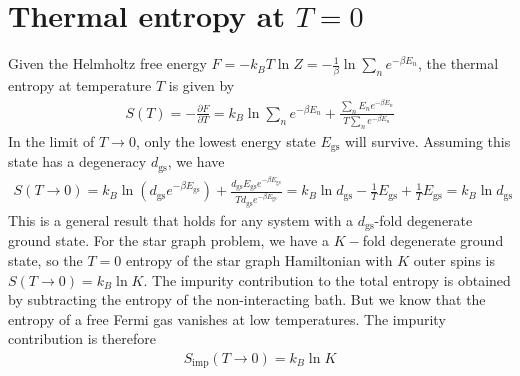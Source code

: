 \documentclass[12pt]{revtex4-2}
\begin{document}
\section{Thermal entropy at \(T=0\)}
Given the Helmholtz free energy \(F = -k_B T \ln Z = - \frac{1}{\beta} \ln\sum_n e^{-\beta E_n}\), the thermal entropy at temperature \(T\) is given by
\begin{align}
	S(T) = - \frac{\partial{F}}{\partial{T}} = k_B \ln\sum_n e^{-\beta E_n} + \frac{\sum_n E_n e^{-\beta E_n}}{T \sum_n e^{-\beta E_n}}
\end{align}
In the limit of \(T \to 0\), only the lowest energy state \(E_\text{gs}\) will survive. Assuming this state has a degeneracy \(d_\text{gs}\), we have
\begin{align}
	S(T \to 0) = k_B \ln\left(d_\text{gs} e^{-\beta E_\text{gs}}\right) + \frac{d_\text{gs} E_\text{gs}e^{-\beta E_\text{gs}}}{T d_\text{gs} e^{-\beta E_\text{gs}}} = k_B \ln d_\text{gs} - \frac{1}{T}E_\text{gs} + \frac{1}{T}E_\text{gs} = k_B \ln d_\text{gs}
\end{align}
This is a general result that holds for any system with a \(d_\text{gs}\)-fold degenerate ground state. For the star graph problem, we have a \(K-\)fold degenerate ground state, so the \(T=0\) entropy of the star graph Hamiltonian with \(K\) outer spins is \(S(T\to 0) = k_B \ln K\). The impurity contribution to the total entropy is obtained by subtracting the entropy of the non-interacting bath. But we know that the entropy of a free Fermi gas vanishes at low temperatures. The impurity contribution is therefore
\begin{align}
	\label{res_entropy}
	S_\text{imp}(T\to 0) = k_B \ln K
\end{align}
\end{document}
